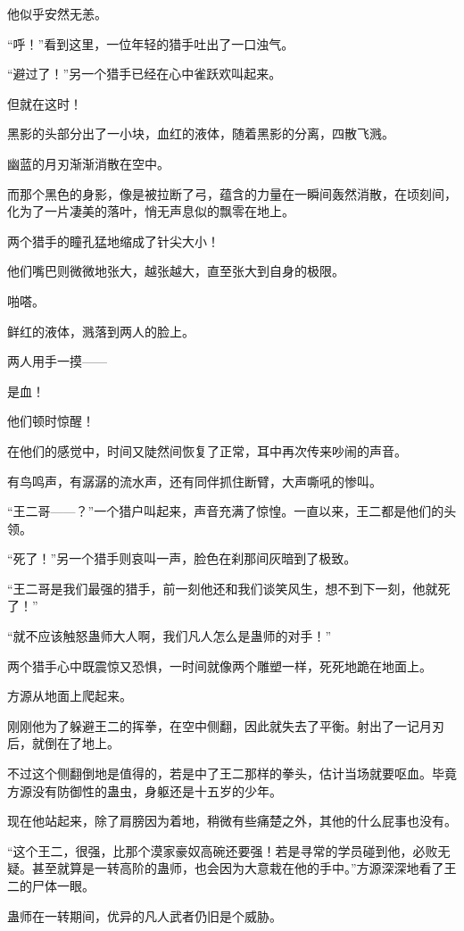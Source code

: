 \begin{this_body}
他似乎安然无恙。

“呼！”看到这里，一位年轻的猎手吐出了一口浊气。

“避过了！”另一个猎手已经在心中雀跃欢叫起来。

但就在这时！

黑影的头部分出了一小块，血红的液体，随着黑影的分离，四散飞溅。

幽蓝的月刃渐渐消散在空中。

而那个黑色的身影，像是被拉断了弓，蕴含的力量在一瞬间轰然消散，在顷刻间，化为了一片凄美的落叶，悄无声息似的飘零在地上。

两个猎手的瞳孔猛地缩成了针尖大小！

他们嘴巴则微微地张大，越张越大，直至张大到自身的极限。

啪嗒。

鲜红的液体，溅落到两人的脸上。

两人用手一摸——

是血！

他们顿时惊醒！

在他们的感觉中，时间又陡然间恢复了正常，耳中再次传来吵闹的声音。

有鸟鸣声，有潺潺的流水声，还有同伴抓住断臂，大声嘶吼的惨叫。

“王二哥——？”一个猎户叫起来，声音充满了惊惶。一直以来，王二都是他们的头领。

“死了！”另一个猎手则哀叫一声，脸色在刹那间灰暗到了极致。

“王二哥是我们最强的猎手，前一刻他还和我们谈笑风生，想不到下一刻，他就死了！”

“就不应该触怒蛊师大人啊，我们凡人怎么是蛊师的对手！”

两个猎手心中既震惊又恐惧，一时间就像两个雕塑一样，死死地跪在地面上。

方源从地面上爬起来。

刚刚他为了躲避王二的挥拳，在空中侧翻，因此就失去了平衡。射出了一记月刃后，就倒在了地上。

不过这个侧翻倒地是值得的，若是中了王二那样的拳头，估计当场就要呕血。毕竟方源没有防御性的蛊虫，身躯还是十五岁的少年。

现在他站起来，除了肩膀因为着地，稍微有些痛楚之外，其他的什么屁事也没有。

“这个王二，很强，比那个漠家豪奴高碗还要强！若是寻常的学员碰到他，必败无疑。甚至就算是一转高阶的蛊师，也会因为大意栽在他的手中。”方源深深地看了王二的尸体一眼。

蛊师在一转期间，优异的凡人武者仍旧是个威胁。


\end{this_body}
